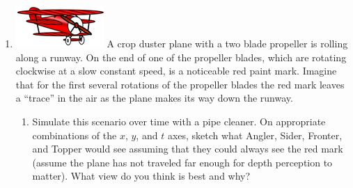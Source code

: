 \begin{enumerate}[resume]
\item \includegraphics{09/09fig1} A crop duster plane with a two blade propeller is rolling along a runway. On the end of one of the propeller blades, which are rotating clockwise at a slow constant speed, is a noticeable red paint mark. Imagine that for the first several rotations of the propeller blades the red mark leaves a ``trace'' in the air as the plane makes its way down the runway.  \label{09problem3}

\begin{enumerate}
\item Simulate this scenario over time with a pipe cleaner. On appropriate combinations of the $x$, $y$, and $t$ axes, sketch what Angler, Sider, Fronter, and Topper would see assuming that they could always see the red mark (assume the plane has not traveled far enough for depth perception to matter). What view do you think is best and why? \label{09problem3parta}



\end{enumerate}
\end{enumerate}
